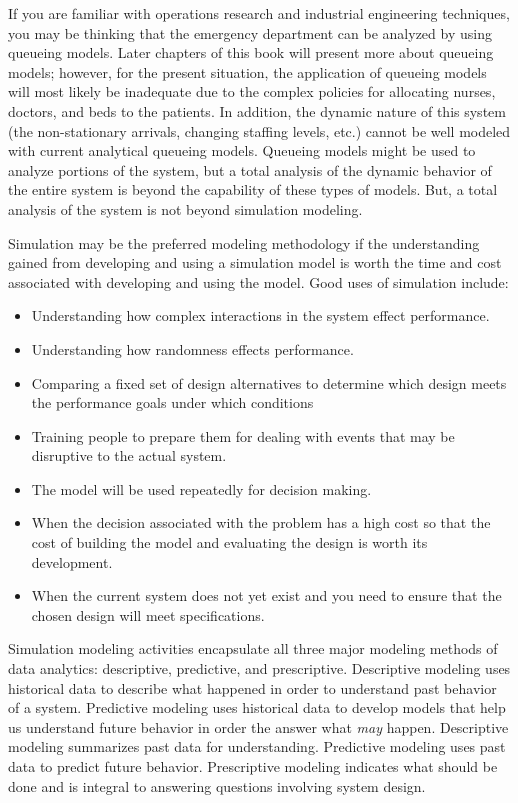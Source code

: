\documentclass[
]{book}
\theoremstyle{definition}
\theoremstyle{definition}
\theoremstyle{definition}
\theoremstyle{definition}
\theoremstyle{remark}
\begin{document}
If you are familiar with operations research and industrial engineering
techniques, you may be thinking that the emergency department can be
analyzed by using queueing models. Later chapters of this book will
present more about queueing models; however, for the present situation,
the application of queueing models will most likely be inadequate due to
the complex policies for allocating nurses, doctors, and beds to the
patients. In addition, the dynamic nature of this system (the
non-stationary arrivals, changing staffing levels, etc.) cannot be well
modeled with current analytical queueing models. Queueing models might
be used to analyze portions of the system, but a total analysis of the
dynamic behavior of the entire system is beyond the capability of these
types of models. But, a total analysis of the system is not beyond
simulation modeling.

Simulation may be the preferred modeling methodology if the understanding gained from
developing and using a simulation model is worth the time and cost
associated with developing and using the model. Good uses of simulation
include:

\begin{itemize}
\item
  Understanding how complex interactions in the system effect
  performance.
\item
  Understanding how randomness effects performance.
\item
  Comparing a fixed set of design alternatives to determine which
  design meets the performance goals under which conditions
\item
  Training people to prepare them for dealing with events that may be
  disruptive to the actual system.
\item
  The model will be used repeatedly for decision making.
\item
  When the decision associated with the problem has a high cost so
  that the cost of building the model and evaluating the design is
  worth its development.
\item
  When the current system does not yet exist and you need to ensure
  that the chosen design will meet specifications.
\end{itemize}

Simulation modeling activities encapsulate all three major modeling methods of data analytics: descriptive, predictive, and prescriptive. Descriptive modeling uses historical data to describe what happened in order to understand past behavior of a system. Predictive modeling uses
historical data to develop models that help us understand future
behavior in order the answer what \emph{may} happen. Descriptive modeling
summarizes past data for understanding. Predictive modeling uses past
data to predict future behavior. Prescriptive modeling indicates what should be done and is integral to answering questions involving system design.
\end{document}
